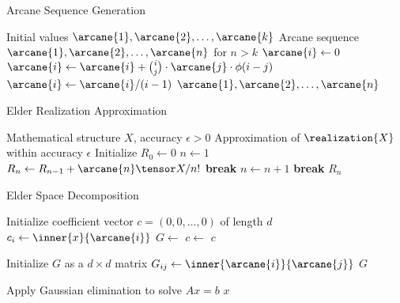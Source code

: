 
\begin{algorithm}
\caption{Arcane Sequence Generation}
\begin{algorithmic}[1]
\Require Initial values $\arcane{1}, \arcane{2}, \ldots, \arcane{k}$
\Ensure Arcane sequence $\arcane{1}, \arcane{2}, \ldots, \arcane{n}$ for $n > k$
    \State $\arcane{i} \gets 0$
        \State $\arcane{i} \gets \arcane{i} + \binom{i}{j} \cdot \arcane{j} \cdot \phi(i-j)$
    \EndFor
    \State $\arcane{i} \gets \arcane{i} / (i-1)$
\EndFor
\State \Return $\arcane{1}, \arcane{2}, \ldots, \arcane{n}$
\end{algorithmic}
\end{algorithm}

\begin{algorithm}
\caption{Elder Realization Approximation}
\begin{algorithmic}[1]
\Require Mathematical structure $X$, accuracy $\epsilon > 0$
\Ensure Approximation of $\realization{X}$ within accuracy $\epsilon$
\State Initialize $R_0 \gets 0$
\State $n \gets 1$
    \State $R_n \gets R_{n-1} + \arcane{n} \tensor X / n!$
        \State \textbf{break}
    \EndIf
    \State $n \gets n + 1$
     
        \State \textbf{break}
    \EndIf
\EndWhile
\State \Return $R_n$
\end{algorithmic}
\end{algorithm}

\begin{algorithm}
\caption{Elder Space Decomposition}
\begin{algorithmic}[1]
    \State Initialize coefficient vector $c = (0, 0, \ldots, 0)$ of length $d$
        \State $c_i \gets \inner{x}{\arcane{i}}$
    \EndFor
    \State $G \gets$ 
    \State $c \gets$ 
    \State \Return $c$
\EndProcedure

    \State Initialize $G$ as a $d \times d$ matrix
            \State $G_{ij} \gets \inner{\arcane{i}}{\arcane{j}}$
        \EndFor
    \EndFor
    \State \Return $G$
\EndFunction

    \State Apply Gaussian elimination to solve $Ax = b$
    \State \Return $x$
\EndFunction
\end{algorithmic}
\end{algorithm}
